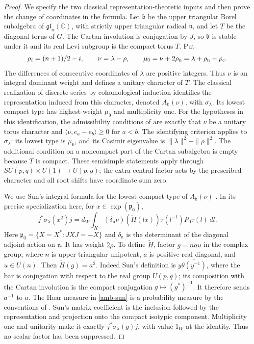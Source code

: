 \begin{proof}
We specify the two classical representation-theoretic inputs
and then prove the change of coordinates in the formula.
Let $\mathfrak b$ be the upper triangular Borel subalgebra of
$\mathfrak{gl}_n(\mathbb C)$, with strictly upper triangular
radical $\mathfrak n$, and let $T$ be the diagonal torus
of $G$. The Cartan involution is conjugation by $J$, so
$\mathfrak b$ is stable under it and its real Levi subgroup
is the compact torus $T$. Put
\[
 \rho_i=(n+1)/2-i,\qquad \nu=\lambda-\rho,\qquad
 \mu_0=\nu+2\rho_{\rm n}
                  =\lambda+\rho_{\rm n}-\rho_{\rm c}.
\]
The differences of consecutive coordinates of $\lambda$
are positive integers. Thus $\nu$ is an integral dominant
weight and defines a unitary character of $T$.
The classical realization of discrete series by
cohomological induction identifies the representation
induced from this character, denoted $A_{\mathfrak b}(\nu)$,
with $\sigma_\lambda$. Its lowest compact type has highest
weight $\mu_0$ and multiplicity one.
For the hypotheses in this identification, the admissibility
conditions of \cite[(5.1), Theorem 5.3]{vogan-zuckerman}
are exactly that $\nu$ be a unitary torus character and
$\langle \nu,e_a-e_b\rangle\ge0$ for $a<b$.
The identifying criterion
\cite[Proposition 6.1]{vogan-zuckerman}
applies to $\sigma_\lambda$: its lowest type is $\mu_0$,
and its Casimir eigenvalue is
$\|\lambda\|^2-\|\rho\|^2$. The additional condition on a
noncompact part of the Cartan subalgebra is empty because
$T$ is compact. These semisimple statements apply through
$SU(p,q)\times U(1)\longrightarrow U(p,q)$; the extra
central factor acts by the prescribed character and all
root shifts have coordinate sum zero.

We use Sun's integral formula for the lowest compact type
of $A_{\mathfrak b}(\nu)$
\cite[Theorem 6.4 and \S6.4, p.~43]{sun-eisenstein}.
In its precise specialization here, for $x\in\exp(\mathfrak p_0)$,
\begin{equation}\label{amb-sun}
 j^*\sigma_\lambda(x^2)j
 =d_W\int_K(\delta_{\mathfrak n}\nu)(\widetilde H(lx))
                       \tau(l^{-1})P_0\tau(l)\,dl.
\end{equation}
Here $\mathfrak p_0=\{X=X^*:JXJ=-X\}$ and
$\delta_{\mathfrak n}$ is the determinant of the diagonal
adjoint action on $\mathfrak n$. It has weight $2\rho$.
To define $\widetilde H$, factor $g=n a u$ in the complex
group, where $n$ is upper triangular unipotent, $a$ is
positive real diagonal, and $u\in U(n)$. Then
$\widetilde H(g)=a^2$.
Indeed Sun's definition is $y\overline{\theta(y^{-1})}$,
where the bar is conjugation with respect to the real
group $U(p,q)$; its composition with the Cartan involution
is the compact conjugation $g\mapsto(g^*)^{-1}$.
It therefore sends $a^{-1}$ to $a$.
The Haar measure in \eqref{amb-sun} is a probability
measure by the conventions of \cite[\S1.2]{sun-eisenstein}.
Sun's matrix coefficient is the inclusion followed by
the representation and projection onto the compact
isotypic component. Multiplicity one and unitarity make
it exactly $j^*\sigma_\lambda(g)j$, with value $1_W$ at
the identity. Thus no scalar factor has been suppressed.


\end{proof}
